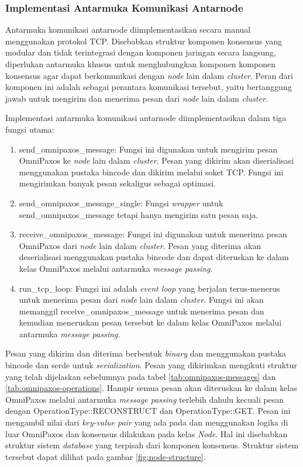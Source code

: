 \subsubsection{Implementasi Antarmuka Komunikasi Antarnode}
\label{subsubsection:implementasi-antarmuka-komunikasi-antarnode}

Antarmuka komunikasi antarnode diimplementasikan secara manual menggunakan protokol TCP. Disebabkan struktur komponen konsensus yang modular dan tidak terintegrasi dengan komponen jaringan secara langsung, diperlukan antarmuka khusus untuk menghubungkan komponen komponen konsensus agar dapat berkomunikasi dengan \textit{node} lain dalam \textit{cluster}. Peran dari komponen ini adalah sebagai perantara komunikasi tersebut, yaitu bertanggung jawab untuk mengirim dan menerima pesan dari \textit{node} lain dalam \textit{cluster}.

Implementasi antarmuka komunikasi antarnode diimplementasikan dalam tiga fungsi utama:
\begin{enumerate}
  \item send\_omnipaxos\_message: Fungsi ini digunakan untuk mengirim pesan OmniPaxos ke \textit{node} lain dalam \textit{cluster}. Pesan yang dikirim akan diserialisasi menggunakan pustaka bincode dan dikirim melalui soket TCP. Fungsi ini mengirimkan banyak pesan sekaligus sebagai optimasi.
  \item send\_omnipaxos\_message\_single: Fungsi \textit{wrapper} untuk send\_omnipaxos\_message tetapi hanya mengirim satu pesan saja.
  \item receive\_omnipaxos\_message: Fungsi ini digunakan untuk menerima pesan OmniPaxos dari \textit{node} lain dalam \textit{cluster}. Pesan yang diterima akan deserialisasi menggunakan pustaka bincode dan dapat diteruskan ke dalam kelas OmniPaxos melalui antarmuka \textit{message passing}.
  \item run\_tcp\_loop: Fungsi ini adalah \textit{event loop} yang berjalan terus-menerus untuk menerima pesan dari \textit{node} lain dalam \textit{cluster}. Fungsi ini akan memanggil receive\_omnipaxos\_message untuk menerima pesan dan kemudian meneruskan pesan tersebut ke dalam kelas OmniPaxos melalui antarmuka \textit{message passing}.
\end{enumerate}

Pesan yang dikirim dan diterima berbentuk \textit{binary} dan menggunakan pustaka bincode dan serde untuk \textit{serialization}. Pesan yang dikirimkan mengikuti struktur yang telah dijelaskan sebelumnya pada tabel \ref{tab:omnipaxos-messages} dan \ref{tab:omnipaxos-operations}. Hampir semua pesan akan diteruskan ke dalam kelas OmniPaxos melalui antarmuka \textit{message passing} terlebih dahulu kecuali pesan dengan OperationType::RECONSTRUCT dan OperationType::GET. Pesan ini mengambil nilai dari \textit{key-value pair} yang ada pada  dan menggunakan logika di luar OmniPaxos dan konsensus dilakukan pada kelas \textit{Node}. Hal ini disebabkan struktur sistem \textit{database} yang terpisah dari komponen konsensus. Struktur sistem tersebut dapat dilihat pada gambar \ref{fig:node-structure}. 